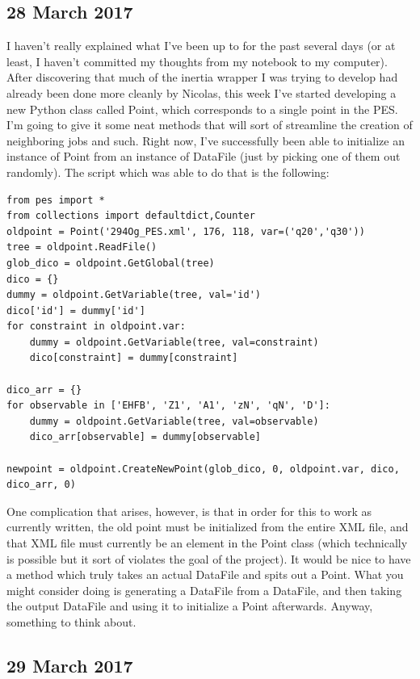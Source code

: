 \documentclass[]{report}
\begin{document}
\subsection*{28 March 2017}
I haven't really explained what I've been up to for the past several days (or at least, I haven't committed my thoughts from my notebook to my computer). After discovering that much of the inertia wrapper I was trying to develop had already been done more cleanly by Nicolas, this week I've started developing a new Python class called Point, which corresponds to a single point in the PES. I'm going to give it some neat methods that will sort of streamline the creation of neighboring jobs and such. Right now, I've successfully been able to initialize an instance of Point from an instance of DataFile (just by picking one of them out randomly). The script which was able to do that is the following:

\begin{verbatim}
from pes import * 
from collections import defaultdict,Counter
oldpoint = Point('294Og_PES.xml', 176, 118, var=('q20','q30'))
tree = oldpoint.ReadFile()
glob_dico = oldpoint.GetGlobal(tree)
dico = {}
dummy = oldpoint.GetVariable(tree, val='id')
dico['id'] = dummy['id']
for constraint in oldpoint.var:
	dummy = oldpoint.GetVariable(tree, val=constraint)
	dico[constraint] = dummy[constraint]
	
dico_arr = {}
for observable in ['EHFB', 'Z1', 'A1', 'zN', 'qN', 'D']:
	dummy = oldpoint.GetVariable(tree, val=observable)
	dico_arr[observable] = dummy[observable]
	
newpoint = oldpoint.CreateNewPoint(glob_dico, 0, oldpoint.var, dico, dico_arr, 0)
\end{verbatim}

One complication that arises, however, is that in order for this to work as currently written, the old point must be initialized from the entire XML file, and that XML file must currently be an element in the Point class (which technically is possible but it sort of violates the goal of the project). It would be nice to have a method which truly takes an actual DataFile and spits out a Point. What you might consider doing is generating a DataFile from a DataFile, and then taking the output DataFile and using it to initialize a Point afterwards. Anyway, something to think about.

\subsection*{29 March 2017}
\end{document}
